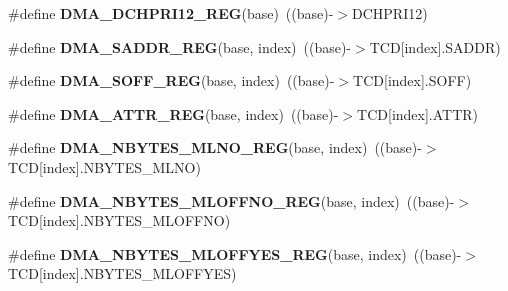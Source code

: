 \begin{DoxyCompactItemize}
\item 
\#define {\bfseries D\+M\+A\+\_\+\+D\+C\+H\+P\+R\+I12\+\_\+\+R\+EG}(base)~((base)-\/$>$D\+C\+H\+P\+R\+I12)\hypertarget{group__DMA__Register__Accessor__Macros_gafc753dbf48306f87b47a395801d548d5}{}\label{group__DMA__Register__Accessor__Macros_gafc753dbf48306f87b47a395801d548d5}

\item 
\#define {\bfseries D\+M\+A\+\_\+\+S\+A\+D\+D\+R\+\_\+\+R\+EG}(base,  index)~((base)-\/$>$T\+CD\mbox{[}index\mbox{]}.S\+A\+D\+DR)\hypertarget{group__DMA__Register__Accessor__Macros_gab407776ade2423789a87e00dcd45d481}{}\label{group__DMA__Register__Accessor__Macros_gab407776ade2423789a87e00dcd45d481}

\item 
\#define {\bfseries D\+M\+A\+\_\+\+S\+O\+F\+F\+\_\+\+R\+EG}(base,  index)~((base)-\/$>$T\+CD\mbox{[}index\mbox{]}.S\+O\+FF)\hypertarget{group__DMA__Register__Accessor__Macros_gacd9d9a137240bea3c222bdbdb6811311}{}\label{group__DMA__Register__Accessor__Macros_gacd9d9a137240bea3c222bdbdb6811311}

\item 
\#define {\bfseries D\+M\+A\+\_\+\+A\+T\+T\+R\+\_\+\+R\+EG}(base,  index)~((base)-\/$>$T\+CD\mbox{[}index\mbox{]}.A\+T\+TR)\hypertarget{group__DMA__Register__Accessor__Macros_ga6892f2d2baef551540d1763d734ae7d0}{}\label{group__DMA__Register__Accessor__Macros_ga6892f2d2baef551540d1763d734ae7d0}

\item 
\#define {\bfseries D\+M\+A\+\_\+\+N\+B\+Y\+T\+E\+S\+\_\+\+M\+L\+N\+O\+\_\+\+R\+EG}(base,  index)~((base)-\/$>$T\+CD\mbox{[}index\mbox{]}.N\+B\+Y\+T\+E\+S\+\_\+\+M\+L\+NO)\hypertarget{group__DMA__Register__Accessor__Macros_ga1c67b54d914f10dff1edc833f7947859}{}\label{group__DMA__Register__Accessor__Macros_ga1c67b54d914f10dff1edc833f7947859}

\item 
\#define {\bfseries D\+M\+A\+\_\+\+N\+B\+Y\+T\+E\+S\+\_\+\+M\+L\+O\+F\+F\+N\+O\+\_\+\+R\+EG}(base,  index)~((base)-\/$>$T\+CD\mbox{[}index\mbox{]}.N\+B\+Y\+T\+E\+S\+\_\+\+M\+L\+O\+F\+F\+NO)\hypertarget{group__DMA__Register__Accessor__Macros_gab232116ded8bac724f9bf9798256e399}{}\label{group__DMA__Register__Accessor__Macros_gab232116ded8bac724f9bf9798256e399}

\item 
\#define {\bfseries D\+M\+A\+\_\+\+N\+B\+Y\+T\+E\+S\+\_\+\+M\+L\+O\+F\+F\+Y\+E\+S\+\_\+\+R\+EG}(base,  index)~((base)-\/$>$T\+CD\mbox{[}index\mbox{]}.N\+B\+Y\+T\+E\+S\+\_\+\+M\+L\+O\+F\+F\+Y\+ES)\hypertarget{group__DMA__Register__Accessor__Macros_gaea5fa2373c445db5628dc17b599fea75}{}\label{group__DMA__Register__Accessor__Macros_gaea5fa2373c445db5628dc17b599fea75}


\end{DoxyCompactItemize}
